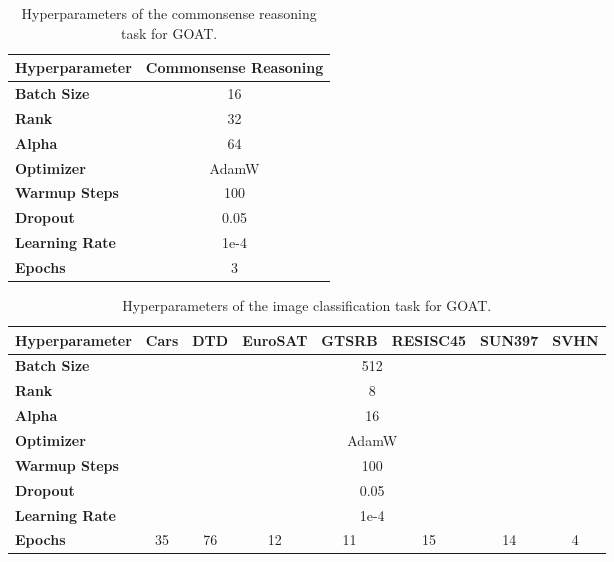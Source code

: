 \begin{table}[ht]
\centering
\small
\caption{Hyperparameters of the commonsense reasoning task for GOAT.}
\begin{tabular}{l|c}
\toprule
\textbf{Hyperparameter}                     & \textbf{Commonsense Reasoning} \\ \midrule
\textbf{Batch Size}                         & 16                    \\
\textbf{Rank}                               & 32                    \\
\textbf{Alpha}                              & 64                    \\
\textbf{Optimizer}                          & AdamW                 \\
\textbf{Warmup Steps}                       & 100                   \\
\textbf{Dropout}                            & 0.05                  \\
\textbf{Learning Rate}                      & 1e-4                  \\ 
\textbf{Epochs}                             & 3                     \\ \bottomrule
\end{tabular}
\label{tab:cs_hyper}
\end{table}

\begin{table}[ht]
\centering
\small
\caption{Hyperparameters of the image classification task for GOAT.}
\begin{tabular}{l|ccccccc}
\toprule
\textbf{Hyperparameter}                     & \textbf{Cars} & \textbf{DTD}  & \textbf{EuroSAT} & \textbf{GTSRB} & \textbf{RESISC45} & \textbf{SUN397} & \textbf{SVHN}  \\ \midrule
\textbf{Batch Size}                         & \multicolumn{7}{c}{512} \\
\textbf{Rank}                               & \multicolumn{7}{c}{8}   \\
\textbf{Alpha}                              & \multicolumn{7}{c}{16}  \\
\textbf{Optimizer}                          & \multicolumn{7}{c}{AdamW} \\
\textbf{Warmup Steps}                       & \multicolumn{7}{c}{100} \\
\textbf{Dropout}                            & \multicolumn{7}{c}{0.05} \\
\textbf{Learning Rate}                      & \multicolumn{7}{c}{1e-4} \\
\textbf{Epochs}                             & 35   & 76   & 12      & 11    & 15       & 14     & 4     \\ \bottomrule
\end{tabular}
\label{tab:cv_hyper}
\end{table}

